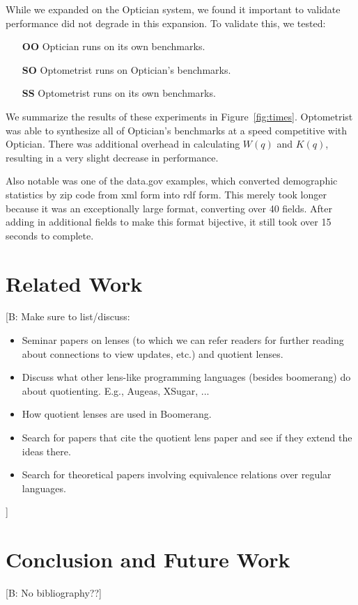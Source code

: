 \documentclass{svproc}
\newcommand{\FINISH}[3]{\ifdraft\textcolor{#1}{[#2: #3]}\fi}
\newcommand{\bcp}[1]{\FINISH{dkred}{B}{#1}}
\newcommand{\Name}{Optometrist}
\newcommand{\OpticianRuntime}{\textbf{OO}}
\newcommand{\SystemOnOptician}{\textbf{SO}}
\newcommand{\SystemOnBenchmarks}{\textbf{SS}}
\begin{document}
While we expanded on the Optician system, we found it important to validate
performance did not degrade in this expansion.  To validate this, we tested:
\begin{itemize}
\item[\OpticianRuntime{}] Optician runs on its own benchmarks.
\item[\SystemOnOptician{}] \Name{} runs on Optician's benchmarks.
\item[\SystemOnBenchmarks{}] \Name{} runs on its own benchmarks.
\end{itemize}

We summarize the results of these experiments in Figure~\ref{fig:times}.
\Name{} was
able to synthesize all of Optician's benchmarks at a speed competitive with
Optician.  There was additional overhead in calculating $W(q)$ and $K(q)$,
resulting in a very slight decrease in performance.

Also notable was one of the data.gov examples, which converted demographic
statistics by zip code from xml form into rdf form.  This merely took longer because it was
an exceptionally large format, converting over 40 fields.  After adding in additional
fields to make this format bijective, it still took over 15 seconds to complete.

\section{Related Work}
\label{relwork} 

\bcp{Make sure to list/discuss:
  \begin{itemize}
  \item Seminar papers on lenses (to which we can refer readers for further
  reading about connections to view updates, etc.) and quotient lenses.
  \item Discuss what other lens-like programming languages (besides
  boomerang) do about quotienting.  E.g., Augeas, XSugar, ...
  \item How quotient lenses are used in Boomerang.
  \item Search for papers that cite the quotient lens paper and see if they
  extend the ideas there.
  \item Search for theoretical papers involving equivalence relations over
  regular languages. 
  \end{itemize}
}

\section{Conclusion and Future Work}
\label{concl}

\bcp{No bibliography??}
\end{document}
